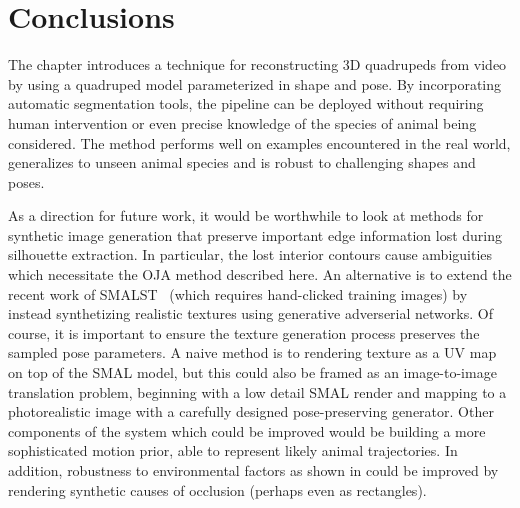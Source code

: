 \section{Conclusions}
The chapter introduces a technique for reconstructing 3D quadrupeds from video by using a quadruped model parameterized in shape and pose. By incorporating automatic segmentation tools, the pipeline can be deployed without requiring human intervention or even precise knowledge of the species of animal being considered. The method performs well on examples encountered in the real world, generalizes to unseen animal species and is robust to challenging shapes and poses. 

As a direction for future work, it would be worthwhile to look at methods for synthetic image generation that preserve important edge information lost during silhouette extraction. In particular, the lost interior contours cause ambiguities which necessitate the OJA method described here. An alternative is to extend the recent work of SMALST~ (which requires hand-clicked training images) by instead synthetizing realistic textures using generative adverserial networks. Of course, it is important to ensure the texture generation process preserves the sampled pose parameters. A naive method is to rendering texture as a UV map on top of the SMAL model, but this could also be framed as an image-to-image translation problem, beginning with a low detail SMAL render and mapping to a photorealistic image with a carefully designed pose-preserving generator. Other components of the system which could be improved would be building a more sophisticated motion prior, able to represent likely animal trajectories. In addition, robustness to environmental factors as shown in  could be improved by rendering synthetic causes of occlusion (perhaps even as rectangles). 
    